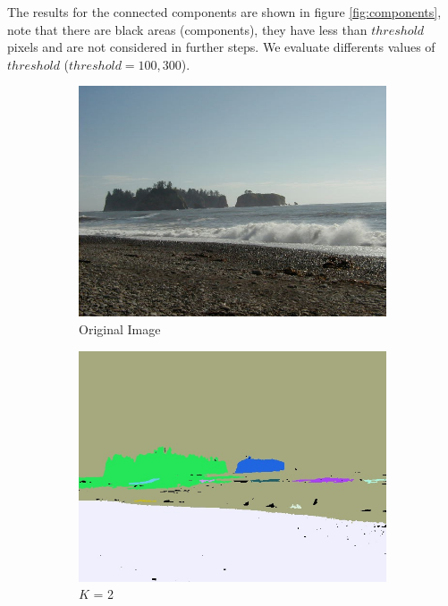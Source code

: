 The results for the connected components are shown in figure \ref{fig:components}, note that there are black areas (components), they have less than $threshold$ pixels and are not considered in further steps. We evaluate differents values of $threshold$ ($threshold = 100, 300 $).


\begin{figure}[H]
	\centering
	\begin{subfigure}{0.5\textwidth}
	  \centering
	  \includegraphics[width=0.9\linewidth]{figs/beach_1.jpg}
	  \caption{Original Image}
	\end{subfigure}%
	\begin{subfigure}{0.5\textwidth}
	  \centering
	  \includegraphics[width=0.9\linewidth]{figs/beach_1_compK2.jpg}
	  \caption{$K$ = 2}
	\end{subfigure}
	\begin{subfigure}{0.5\textwidth}

\end{subfigure}
\end{figure}
